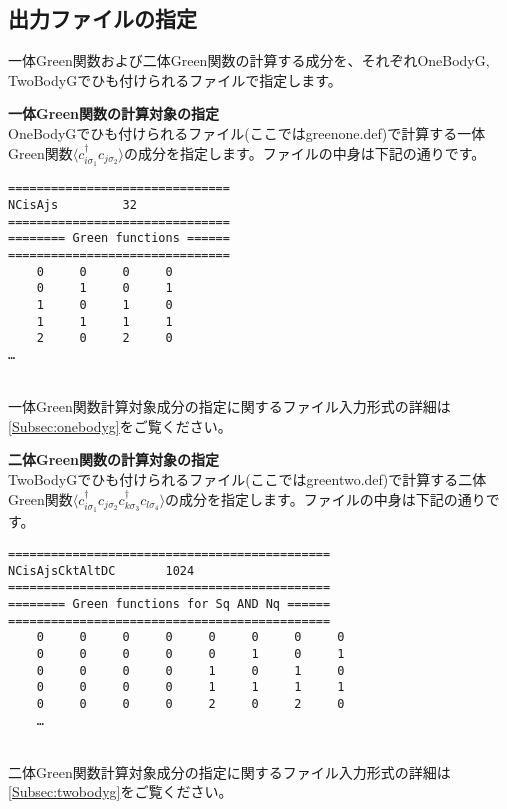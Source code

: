 \subsection{出力ファイルの指定}
一体Green関数および二体Green関数の計算する成分を、それぞれOneBodyG, TwoBodyGでひも付けられるファイルで指定します。
\begin{description}
\item {\bf 一体Green関数の計算対象の指定}\\
OneBodyGでひも付けられるファイル(ここではgreenone.def)で計算する一体Green関数$\langle c_{i\sigma_1}^{\dag}c_{j\sigma_2} \rangle$の成分を指定します。ファイルの中身は下記の通りです。\\
\begin{minipage}{15cm}
\begin{screen}
\begin{verbatim}
===============================
NCisAjs         32
===============================
======== Green functions ======
===============================
    0     0     0     0
    0     1     0     1
    1     0     1     0
    1     1     1     1
    2     0     2     0
…
\end{verbatim}
\end{screen}
\end{minipage}
~\\
一体Green関数計算対象成分の指定に関するファイル入力形式の詳細は\ref{Subsec:onebodyg}をご覧ください。
\item {\bf 二体Green関数の計算対象の指定}\\
TwoBodyGでひも付けられるファイル(ここではgreentwo.def)で計算する二体Green関数$\langle c_{i\sigma_1}^{\dag}c_{j\sigma_2}c_{k\sigma_3}^{\dag}c_{l\sigma_4} \rangle$の成分を指定します。ファイルの中身は下記の通りです。\\
\begin{minipage}{15cm}
\begin{screen}
\begin{verbatim}
=============================================
NCisAjsCktAltDC       1024
=============================================
======== Green functions for Sq AND Nq ======
=============================================
    0     0     0     0     0     0     0     0
    0     0     0     0     0     1     0     1
    0     0     0     0     1     0     1     0
    0     0     0     0     1     1     1     1
    0     0     0     0     2     0     2     0
    …
\end{verbatim}
\end{screen}
\end{minipage}
~\\
二体Green関数計算対象成分の指定に関するファイル入力形式の詳細は\ref{Subsec:twobodyg}をご覧ください。
\end{description}


